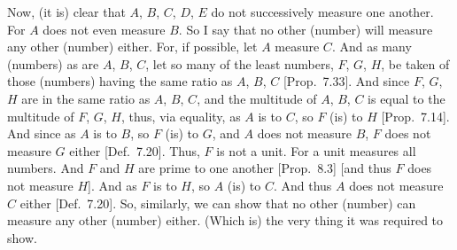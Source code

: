 \begin{Parallel}{}{}
{ 
 Now, (it is) clear that $A$, $B$, $C$, $D$, $E$ do not successively measure
 one another. For $A$ does not even measure $B$. So I say that  
 no other (number) will measure any other (number) either. For, if possible, let $A$ measure
 $C$. And as many (numbers) as  are $A$, $B$, $C$, let  so many of the least numbers,
 $F$, $G$, $H$, be taken of those (numbers) having the same ratio as $A$, $B$, $C$ [Prop.~7.33]. And since $F$, $G$, $H$ are in the same ratio as $A$, $B$, $C$, and the multitude of
 $A$, $B$, $C$ is equal to the multitude of $F$, $G$, $H$, thus, via
 equality, as $A$ is to $C$, so $F$ (is) to $H$ [Prop.~7.14]. And since as $A$ is to $B$, so $F$ (is) to $G$, and $A$ does not measure $B$, $F$ does not measure $G$ either
 [Def.~7.20]. Thus, $F$ is not a unit. For a unit measures all numbers. And $F$ and $H$ are prime to one another [Prop.~8.3] [and thus $F$ does not measure $H$].
 And as $F$ is to $H$, so $A$ (is) to $C$. And thus $A$ does not measure
 $C$ either [Def.~7.20]. So, similarly, we can show
 that no other (number) can measure any other (number) either.
 (Which is) the very thing it was required to show.}
\end{Parallel}

\begin{Parallel}{}{} 

\end{Parallel}

